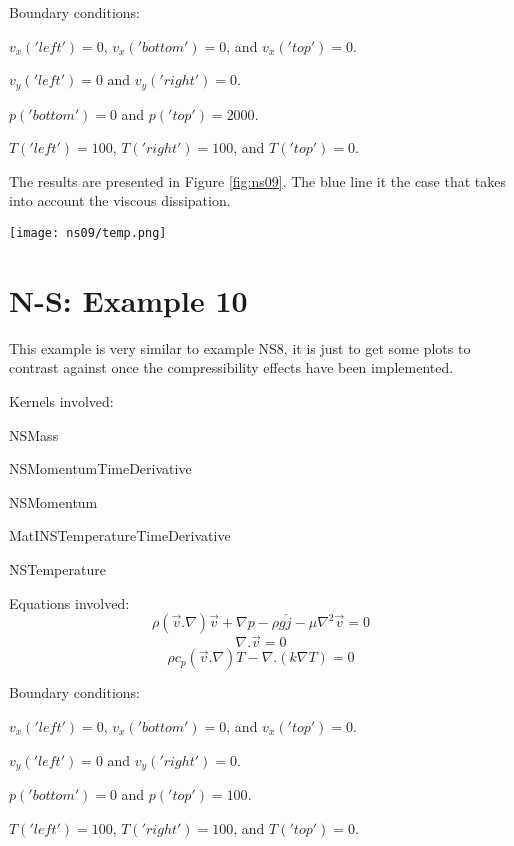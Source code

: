 \documentclass[11pt,letterpaper]{article}
\begin{document}
Boundary conditions:
\begin{description}[]
	\item[] $v_{x}('left')=0$, $v_{x}('bottom')=0$, and $v_{x}('top')=0$.
	\item[] $v_{y}('left')=0$ and $v_{y}('right')=0$.
	\item[] $p('bottom')=0$ and $p('top')=2000$.
	\item[] $T('left')=100$, $T('right')=100$, and $T('top')=0$.
\end{description}

The results are presented in Figure \ref{fig:ns09}. The blue line it the case that takes into account the viscous dissipation.
\begin{figure*}[!h]
	\centering
	\texttt{[image: ns09/temp.png]} 
	\hfill
	\caption{Temperature ignoring and taking into account the viscous dissipation.}
	\label{fig:ns09}
\end{figure*}

\section{N-S: Example 10}

This example is very similar to example NS8, it is just to get some plots to contrast against once the compressibility effects have been implemented.

Kernels involved:
\begin{description}[font=$\bullet$\scshape\bfseries]
	\item[] NSMass
	\item[] NSMomentumTimeDerivative
	\item[] NSMomentum
	\item[] MatINSTemperatureTimeDerivative
	\item[] NSTemperature
\end{description}

Equations involved:
\begin{equation}
\rho (\vec{v}.\nabla)\vec{v} + \nabla p - \rho g \check{j} - \mu \nabla^{2}\vec{v} = 0
\end{equation}
\begin{equation}
\nabla.\vec{v}=0
\end{equation}
\begin{equation}
\rho c_{p} (\vec{v}.\nabla)T - \nabla .(k\nabla T) = 0
\end{equation}

Boundary conditions:
\begin{description}[]
	\item[] $v_{x}('left')=0$, $v_{x}('bottom')=0$, and $v_{x}('top')=0$.
	\item[] $v_{y}('left')=0$ and $v_{y}('right')=0$.
	\item[] $p('bottom')=0$ and $p('top')=100$.
	\item[] $T('left')=100$, $T('right')=100$, and $T('top')=0$.
\end{description}
\end{document}
